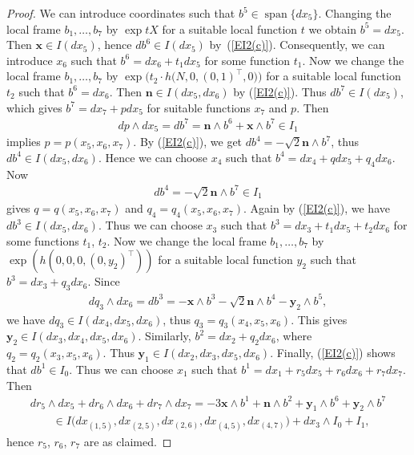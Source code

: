 \documentclass[11pt]{article}
\numberwithin{equation}{section}
\newcommand\bx{{\mathbf x}}
\newcommand\by{{\mathbf y}}
\newcommand\bn{{\mathbf n}}
\newcommand{\Span}{\operatorname{span}}
\begin{document}
\begin{proof} We can introduce coordinates such that $b^5\in\Span\{dx_5\}$. Changing the local frame $b_1,\dots , b_7$ by $\exp tX$ for a suitable local function $t$ we obtain $b^5=dx_5$. Then $\bx\in I(dx_5)$, hence $db^6\in I(dx_5)$ by~(\ref{EI2(c)}). Consequently, we can introduce $x_6$ such that $b^6 =dx_6 + t_1 dx_5$ for some function $t_1$. Now we change the local frame $b_1,\dots,b_7$ by $\exp \big(t_2\cdot h\big(N,0,(0,1)^\top,0\big)\big)$ for a suitable local function $t_2$ such that $b^6=dx_6$. Then $\bn\in I(dx_5,dx_6)$ by (\ref{EI2(c)}).
Thus $db^7\in I(dx_5)$, which gives $b^7=dx_7+pdx_5$ for suitable functions $x_7$ and $p$. Then
\begin{gather*}dp\wedge dx_5=db^7=\bn\wedge b^6+ \bx\wedge b^7 \in I_1\end{gather*}
implies $p=p(x_5,x_6,x_7)$. By (\ref{EI2(c)}), we get $db^4=-\sqrt 2 \bn\wedge b^7$, thus $db^4\in I(dx_5, dx_6)$. Hence we can choose $x_4$ such that $b^4=dx_4+ qdx_5+q_4dx_6$. Now
\begin{gather*}db^4=-\sqrt 2 \bn\wedge b^7\in I_1\end{gather*} gives $q=q(x_5,x_6,x_7)$ and $q_4=q_4(x_5,x_6,x_7)$. Again by (\ref{EI2(c)}), we have $db^3\in I(dx_5,dx_6)$. Thus we can choose $x_3$ such that $b^3=dx_3+t_1dx_5+t_2 dx_6$ for some functions $t_1$, $t_2$. Now we change the local frame $b_1,\dots,b_7$ by $\exp (h(0,0,0,(0,y_2)^\top))$ for a suitable local function $y_2$ such that $b^3=dx_3+q_3dx_6$. Since
\begin{gather*}dq_3\wedge dx_6=db^3=-\bx\wedge b^3 -\sqrt 2\bn\wedge b^4-\by_2\wedge b^5,\end{gather*}
we have $dq_3\in I(dx_4,dx_5, dx_6)$, thus $q_3=q_3(x_4,x_5,x_6)$. This gives $\by_2\in I(dx_3,dx_4,dx_5,dx_6)$.
Similarly, $b^2=dx_2+q_2dx_6$, where $q_2=q_2(x_3,x_5,x_6)$. Thus $\by_1\in I(dx_2,dx_3,dx_5,dx_6)$. Finally, (\ref{EI2(c)}) shows that $db^1\in I_0$. Thus we can choose $x_1$ such that $b^1=dx_1+ r_5dx_5+r_6dx_6+r_7dx_7$. Then
\begin{gather*}
 dr_5\wedge dx_5+dr_6\wedge dx_6+dr_7\wedge dx_7= -3\bx\wedge b^1+\bn\wedge b^2+\by_1\wedge b^6+\by_2\wedge b^7 \\
\qquad{} \in I\big( dx_{(1,5)}, dx_{(2,5)}, dx_{(2,6)}, dx_{(4,5)}, dx_{(4,7)}\big)+ dx_3\wedge I_0 +I_1,
\end{gather*}
hence $r_5$, $r_6$, $r_7$ are as claimed.


\end{proof}
\end{document}
